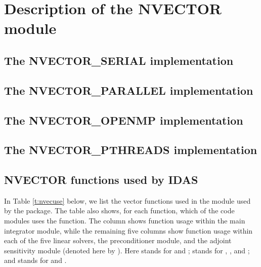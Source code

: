 \chapter{Description of the NVECTOR module}\label{s:nvector}


\section{The NVECTOR\_SERIAL implementation}\label{ss:nvec_ser}


\section{The NVECTOR\_PARALLEL implementation}\label{ss:nvec_par}


\section{The NVECTOR\_OPENMP implementation}\label{ss:nvec_openmp}


\section{The NVECTOR\_PTHREADS implementation}\label{ss:nvec_pthreads}


\section{NVECTOR functions used by IDAS}

In Table \ref{t:nvecuse} below, we list the vector functions used in the 
{\nvector} module used by the {\idas} package.
The table also shows, for each function, which of the code modules uses
the function. The {\idas} column shows function usage within the main
integrator module, while the remaining five columns show function usage
within each of the five {\idas} linear solvers, the {\idabbdpre}
preconditioner module, and the {\idas} adjoint sensitivity module
(denoted here by {\idaa}).
Here {\idadls} stands for {\idadense} and {\idaband}; {\idaspils} stands
for {\idaspgmr}, {\idaspbcg}, and {\idasptfqmr}; and {\idasls}
stands for {\idaklu} and {\idasuperlumt}.

